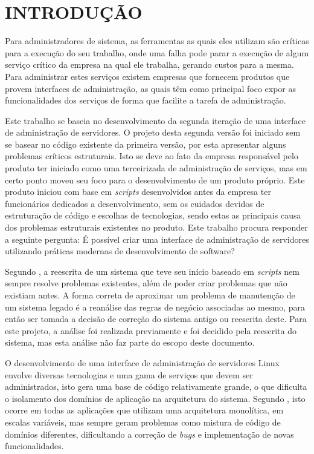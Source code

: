 \chapter{INTRODUÇÃO}
\label{chp:intro}

Para administradores de sistema, as ferramentas as quais eles utilizam são
críticas para a execução do seu trabalho, onde uma falha pode parar a execução
de algum serviço crítico da empresa na qual ele trabalha, gerando custos para
a mesma. Para administrar estes serviços existem empresas que fornecem
produtos que provem interfaces de administração, as quais têm como principal
foco expor as funcionalidades dos serviços de forma que facilite a tarefa
de administração.

Este trabalho se baseia no desenvolvimento da segunda iteração de uma
interface de administração de servidores. O projeto desta segunda versão
foi iniciado sem se basear no código existente da primeira versão, por esta
apresentar alguns problemas críticos estruturais. Isto se deve ao fato da
empresa responsável pelo produto ter iniciado como uma terceirizada de
administração de serviços, mas em certo ponto moveu seu foco para o
desenvolvimento de um produto próprio. Este produto iniciou com base em
\emph{scripts} desenvolvidos antes da empresa ter funcionários dedicados a
desenvolvimento, sem os cuidados devidos de estruturação de código e escolhas
de tecnologias, sendo estas as principais causa dos problemas estruturais
existentes no produto. Este trabalho procura responder a seguinte pergunta:
É possível criar uma interface de administração de servidores utilizando
práticas modernas de desenvolvimento de software?

Segundo , a reescrita de um sistema que teve seu
início baseado em \emph{scripts} nem sempre resolve problemas existentes,
além de poder criar problemas que não existiam antes. A forma correta de
aproximar um problema de manutenção de um sistema legado é a reanálise das
regras de negócio associadas ao mesmo, para então ser tomada a decisão de
correção do sistema antigo ou reescrita deste. Para este projeto, a análise
foi realizada previamente e foi decidido pela reescrita do sistema, mas esta
análise não faz parte do escopo deste documento.

O desenvolvimento de uma interface de administração de servidores Linux
envolve diversas tecnologias e uma gama de serviços que devem ser
administrados, isto gera uma base de código relativamente grande, o que
dificulta o isolamento dos domínios de aplicação na arquitetura
do sistema. Segundo , isto ocorre em todas as aplicações
que utilizam uma arquitetura monolítica, em escalas variáveis, mas sempre
geram problemas como mistura de código de domínios diferentes, dificultando
a correção de \emph{bugs} e implementação de novas funcionalidades.

